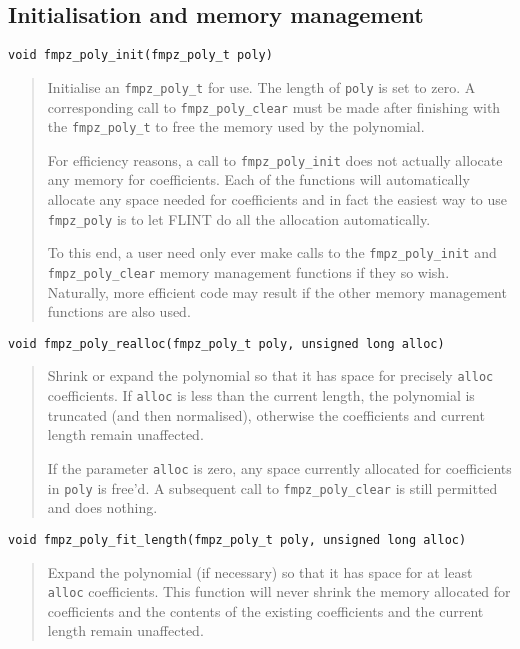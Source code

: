 \documentclass[a4paper,10pt]{article}
\newcommand{\code}{\lstinline}
\begin{document}
\subsection{Initialisation and memory management}

\begin{lstlisting}
void fmpz_poly_init(fmpz_poly_t poly)
\end{lstlisting}
\begin{quote}
Initialise an \code{fmpz_poly_t} for use. The length of \code{poly} is set to zero. A corresponding call to \code{fmpz_poly_clear} must be made after finishing with the \code{fmpz_poly_t} to free the memory used by the polynomial.

For efficiency reasons, a call to \code{fmpz_poly_init} does not actually allocate any memory for coefficients. Each of the functions will automatically allocate any space needed for coefficients and in fact the easiest way to use \code{fmpz_poly} is to let FLINT do all the allocation automatically. 

To this end, a user need only ever make calls to the \code{fmpz_poly_init} and \code{fmpz_poly_clear} memory management functions if they so wish. Naturally, more efficient code may result if the other memory management functions are also used.
\end{quote}

\begin{lstlisting}
void fmpz_poly_realloc(fmpz_poly_t poly, unsigned long alloc)
\end{lstlisting}
\begin{quote}
Shrink or expand the polynomial so that it has space for precisely \code{alloc} coefficients. If \code{alloc} is less than the current length, the polynomial is truncated (and then normalised), otherwise the coefficients and current length remain unaffected. 

If the parameter \code{alloc} is zero, any space currently allocated for coefficients in \code{poly} is free'd. A subsequent call to \code{fmpz_poly_clear} is still permitted and does nothing.
\end{quote}

\begin{lstlisting}
void fmpz_poly_fit_length(fmpz_poly_t poly, unsigned long alloc)
\end{lstlisting}
\begin{quote}
Expand the polynomial (if necessary) so that it has space for at least \code{alloc} coefficients. This function will never shrink the memory allocated for coefficients and the contents of the existing coefficients and the current length remain unaffected. 
\end{quote}
\end{document}
